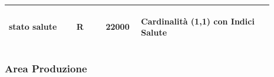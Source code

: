 \documentclass[12pt,a4paper]{article}
\begin{document}
\begin{center}
\begin{longtable}{|p{0.23\linewidth}|p{0.1\linewidth}|p{0.11\linewidth}|p{0.45\linewidth}|}
\hline
stato salute
 & 
\begin{center}\vspace{-25pt}R\end{center}
 & 
\begin{center}\vspace{-25pt}22000\end{center}
 & 
\begin{flushleft}\vspace{-25pt}Cardinalità (1,1) con Indici Salute\end{flushleft}
\\

\hline

\end{longtable}\end{center}


\subsubsection{Area Produzione}
\end{document}
